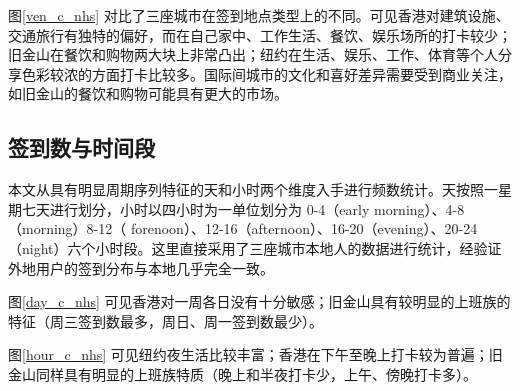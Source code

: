 \documentclass[UTF8]{ctexart}
\begin{document}
		图\ref{ven_c_nhs} 对比了三座城市在签到地点类型上的不同。可见香港对建筑设施、交通旅行有独特的偏好，而在自己家中、工作生活、餐饮、娱乐场所的打卡较少；旧金山在餐饮和购物两大块上非常凸出；纽约在生活、娱乐、工作、体育等个人分享色彩较浓的方面打卡比较多。国际间城市的文化和喜好差异需要受到商业关注，如旧金山的餐饮和购物可能具有更大的市场。
		
		\subsection{签到数与时间段}
		本文从具有明显周期序列特征的天和小时两个维度入手进行频数统计。天按照一星期七天进行划分，小时以四小时为一单位划分为 0-4（early morning）、4-8（morning）8-12（ forenoon）、12-16（afternoon）、16-20（evening）、20-24（night）六个小时段。这里直接采用了三座城市本地人的数据进行统计，经验证外地用户的签到分布与本地几乎完全一致。
		
		图\ref{day_c_nhs} 可见香港对一周各日没有十分敏感；旧金山具有较明显的上班族的特征（周三签到数最多，周日、周一签到数最少）。
		
		图\ref{hour_c_nhs} 可见纽约夜生活比较丰富；香港在下午至晚上打卡较为普遍；旧金山同样具有明显的上班族特质（晚上和半夜打卡少，上午、傍晚打卡多）。
		
\end{document}
